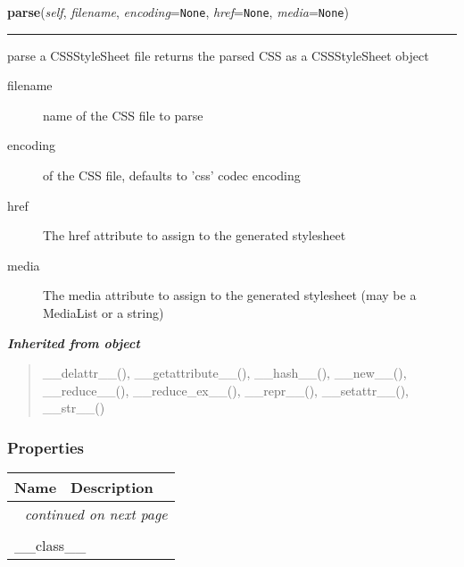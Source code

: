 \hspace{.8\funcindent}\begin{boxedminipage}{\funcwidth}

    \raggedright \textbf{parse}(\textit{self}, \textit{filename}, \textit{encoding}={\tt None}, \textit{href}={\tt None}, \textit{media}={\tt None})

    \vspace{-1.5ex}

    \rule{\textwidth}{0.5\fboxrule}
\setlength{\parskip}{2ex}

parse a CSSStyleSheet file
returns the parsed CSS as a CSSStyleSheet object
\begin{description}
\item[{filename}] \leavevmode 
name of the CSS file to parse

\item[{encoding}] \leavevmode 
of the CSS file, defaults to 'css' codec encoding

\item[{href}] \leavevmode 
The href attribute to assign to the generated stylesheet

\item[{media}] \leavevmode 
The media attribute to assign to the generated stylesheet
(may be a MediaList or a string)

\end{description}
\setlength{\parskip}{1ex}
    \end{boxedminipage}


\large{\textbf{\textit{Inherited from object}}}

\begin{quote}
\_\_delattr\_\_(), \_\_getattribute\_\_(), \_\_hash\_\_(), \_\_new\_\_(), \_\_reduce\_\_(), \_\_reduce\_ex\_\_(), \_\_repr\_\_(), \_\_setattr\_\_(), \_\_str\_\_()
\end{quote}


  \subsubsection{Properties}

    \vspace{-1cm}
\hspace{\varindent}\begin{longtable}{|p{\varnamewidth}|p{\vardescrwidth}|l}
\cline{1-2}
\cline{1-2} \centering \textbf{Name} & \centering \textbf{Description}& \\
\cline{1-2}
\endhead\cline{1-2}\multicolumn{3}{r}{\small\textit{continued on next page}}\\\endfoot\cline{1-2}
\endlastfoot\multicolumn{2}{|l|}{\textit{Inherited from object}}\\
\multicolumn{2}{|p{\varwidth}|}{\raggedright \_\_class\_\_}\\
\cline{1-2}
\end{longtable}

